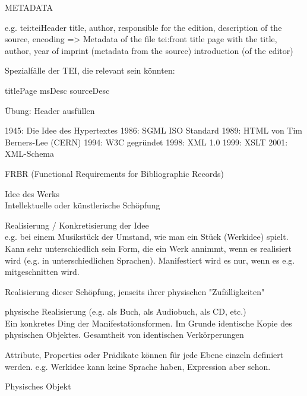 



METADATA

e.g.
tei:teiHeader
title, author, responsible for the edition, description of the source, encoding
=> Metadata of the file
tei:front
title page with the title, author, year of imprint (metadata from the source)
introduction (of the editor)


Spezialfälle der TEI, die relevant sein könnten:

titlePage
msDesc
sourceDesc 

Übung: Header ausfüllen

















1945: Die Idee des Hypertextes
1986: SGML ISO Standard
1989: HTML von Tim Berners-Lee (CERN)
1994: W3C gegründet
1998: XML 1.0
1999: XSLT
2001: XML-Schema




\begin{frame}{FRBR (Functional Requirements for
Bibliographic Records)}

 Idee des Werks \\
Intellektuelle oder künstlerische Schöpfung

 Realisierung / Konkretisierung der Idee \\
e.g. bei einem Musikstück der Umstand, wie man ein Stück (Werkidee) spielt. Kann sehr unterschiedlich sein 
Form, die ein Werk annimmt, wenn es realisiert wird (e.g. in unterschiedlichen Sprachen).
Manifestiert wird es nur, wenn es e.g. mitgeschnitten wird.

Realisierung dieser Schöpfung, jenseits ihrer
physischen "Zufälligkeiten"

 physische Realisierung (e.g. als Buch, als Audiobuch, als CD, etc.) \\
 Ein konkretes Ding der Manifestationsformen. Im Grunde identische Kopie des physischen Objektes.
Gesamtheit von identischen Verkörperungen

Attribute, Properties oder Prädikate können für jede Ebene einzeln definiert werden. e.g. Werkidee kann keine Sprache haben, Expression aber schon. 

Physisches Objekt
\end{frame}

